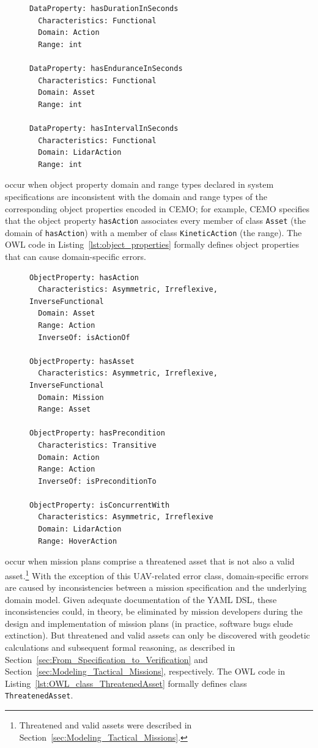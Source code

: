 {\begin{figure}[ht]
\begin{lstlisting}[caption={Data properties specified in OWL},label=lst:data_properties]
DataProperty: hasDurationInSeconds
  Characteristics: Functional
  Domain: Action
  Range: int

DataProperty: hasEnduranceInSeconds
  Characteristics: Functional
  Domain: Asset
  Range: int

DataProperty: hasIntervalInSeconds
  Characteristics: Functional
  Domain: LidarAction
  Range: int
\end{lstlisting}
\end{figure}

 occur when object property domain and range types declared in system specifications are inconsistent with the domain and range types of the corresponding object properties encoded in CEMO; for example, CEMO specifies that the object property \texttt{hasAction} associates every member of class \texttt{Asset} (the domain of \texttt{hasAction}) with a member of class \texttt{KineticAction} (the range). The OWL code in Listing~\ref{lst:object_properties} formally defines object properties that can cause domain-specific errors.

\begin{figure}[ht]
\begin{lstlisting}[caption={Object properties specified in OWL},label=lst:object_properties]
ObjectProperty: hasAction
  Characteristics: Asymmetric, Irreflexive, InverseFunctional
  Domain: Asset
  Range: Action
  InverseOf: isActionOf

ObjectProperty: hasAsset
  Characteristics: Asymmetric, Irreflexive, InverseFunctional
  Domain: Mission
  Range: Asset

ObjectProperty: hasPrecondition
  Characteristics: Transitive
  Domain: Action
  Range: Action
  InverseOf: isPreconditionTo

ObjectProperty: isConcurrentWith
  Characteristics: Asymmetric, Irreflexive
  Domain: LidarAction
  Range: HoverAction
\end{lstlisting}
\end{figure}

 occur when mission plans comprise a threatened asset that is not also a valid asset.\footnote{Threatened and valid assets were described in Section~\ref{sec:Modeling_Tactical_Missions}.} With the exception of this UAV-related error class, domain-specific errors are caused by inconsistencies between a mission specification and the underlying domain model. Given adequate documentation of the YAML DSL, these inconsistencies could, in theory, be eliminated by mission developers during the design and implementation of mission plans (in practice, software bugs elude extinction). But threatened and valid assets can only be discovered with geodetic calculations and subsequent formal reasoning, as described in Section~\ref{sec:From_Specification_to_Verification} and Section~\ref{sec:Modeling_Tactical_Missions}, respectively. The OWL code in Listing~\ref{lst:OWL_class_ThreatenedAsset} formally defines class \texttt{ThreatenedAsset}.

}

